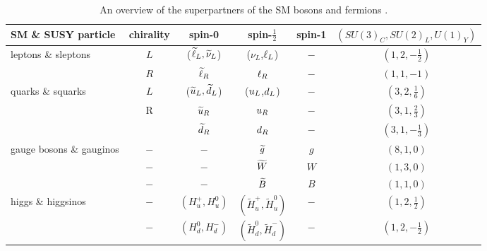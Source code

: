 \begin{table}[ht!]
\def\arraystretch{1.2}
\setlength{\belowcaptionskip}{6pt}
\small
\centering
\caption{An overview of the superpartners of the SM bosons and fermions \cite{Martin:1997ns}.}
\label{tab:susy}
\begin{tabular}{l c c c c c}
        \hline \hline
        SM \& SUSY particle              & chirality         &spin-0                 & spin-$\frac{1}{2}$                              &spin-1 &\small{$(SU(3)_{C},SU(2)_{L},U(1)_{Y})$}\\\hline
        \multirow{2}{*}{leptons \& sleptons}     & $L$               &($\widetilde{\ell}_{L},\widetilde{\nu}_{L}$)      & ($\nu_{L}$,$\ell_{L}$)                             &$-$    & $(1,2,-\frac{1}{2})$ \\
                                                 & $R$               &$\widetilde{\ell}_{R}$               & $\ell_{R}$                                         &$-$    & $(1,1,-1)$ \\\hline
        \multirow{3}{*}{quarks \& squarks}       & $L$               &($\widetilde{u}_{L},\widetilde{d}_{L}$)      & ($u_{L}$,$d_{L}$)                               &$-$    & $(3,2,\frac{1}{6})$ \\
                                                 & \multirow{2}{*}{R}&$\widetilde{u}_{R}$                & $u_{R}$                                          &$-$    & $(3,1,\frac{2}{3})$ \\
                                                 &                   &$\widetilde{d}_{R}$              & $d_{R}$                                        &$-$    & $(3,1,-\frac{1}{3})$ \\\hline
        \multirow{3}{*}{gauge bosons \& gauginos}& $-$               &$-$                    & $\widetilde{g}$                                       &$g$    & $(8,1,0)$ \\
                                                 & $-$               &$-$                    & $\widetilde{W}$                                         &$W$    & $(1,3,0)$ \\
                                                 & $-$               &$-$                    & $\widetilde{B}$                                         &$B$    & $(1,1,0)$ \\\hline
        \multirow{2}{*}{higgs \& higgsinos}      & $-$               &$(H^{+}_{u},H^{0}_{u})$& $(\widetilde{H}^{+}_{u},\widetilde{H}^{0}_{u})$ &$-$    & $(1,2,\frac{1}{2})$ \\
                                                 & $-$               &$(H^{0}_{d},H^{-}_{d})$& $(\widetilde{H}^{0}_{d},\widetilde{H}^{-}_{d})$ &$-$    & $(1,2,-\frac{1}{2})$ \\
\hline\hline
\end{tabular}
\end{table}                                                                                                                                                                                             
